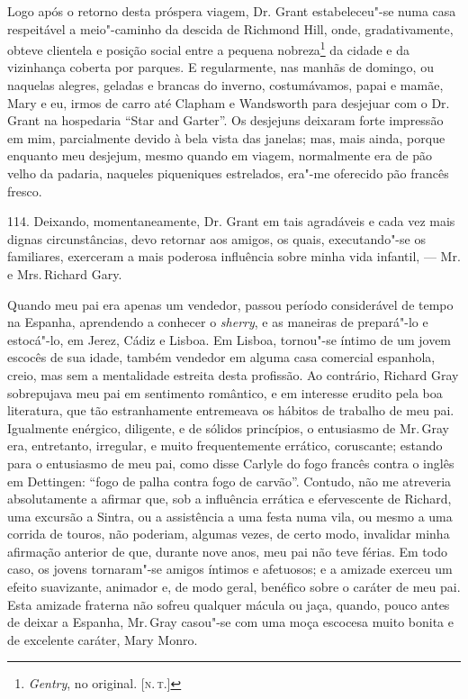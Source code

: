 Logo após o retorno desta próspera viagem, Dr. Grant estabeleceu"-se numa
casa respeitável a meio"-caminho da descida de Richmond Hill, onde,
gradativamente, obteve clientela e posição social entre a pequena
nobreza\footnote{\emph{Gentry}, no original. {[}\textsc{n.\,t.}{]}} da cidade e
da vizinhança coberta por parques. E regularmente, nas manhãs de
domingo, ou naquelas alegres, geladas e brancas do inverno,
costumávamos, papai e mamãe, Mary e eu, irmos de carro até Clapham e
Wandsworth para desjejuar com o Dr. Grant na hospedaria ``Star and
Garter''. Os desjejuns deixaram forte impressão em mim, parcialmente
devido à bela vista das janelas; mas, mais ainda, porque enquanto meu
desjejum, mesmo quando em viagem, normalmente era de pão velho da
padaria, naqueles piqueniques estrelados, era"-me oferecido pão francês
fresco.

114. Deixando, momentaneamente, Dr. Grant em tais agradáveis e cada vez
mais dignas circunstâncias, devo retornar aos amigos, os quais,
executando"-se os familiares, exerceram a mais poderosa influência sobre
minha vida infantil, --- Mr. e Mrs.\,Richard Gary.

Quando meu pai era apenas um vendedor, passou período considerável de
tempo na Espanha, aprendendo a conhecer o \emph{sherry}, e as maneiras
de prepará"-lo e estocá"-lo, em Jerez, Cádiz e Lisboa. Em Lisboa,
tornou"-se íntimo de um jovem escocês de sua idade, também vendedor em
alguma casa comercial espanhola, creio, mas sem a mentalidade estreita
desta profissão. Ao contrário, Richard Gray sobrepujava meu pai em
sentimento romântico, e em interesse erudito pela boa literatura, que
tão estranhamente entremeava os hábitos de trabalho de meu pai.
Igualmente enérgico, diligente, e de sólidos princípios, o entusiasmo de
Mr.\,Gray era, entretanto, irregular, e muito frequentemente errático,
coruscante; estando para o entusiasmo de meu pai, como disse Carlyle do
fogo francês contra o inglês em Dettingen: ``fogo de palha contra fogo
de carvão''. Contudo, não me atreveria absolutamente a afirmar que, sob
a influência errática e efervescente de Richard, uma excursão a Sintra,
ou a assistência a uma festa numa vila, ou mesmo a uma corrida de
touros, não poderiam, algumas vezes, de certo modo, invalidar minha
afirmação anterior de que, durante nove anos, meu pai não teve férias.
Em todo caso, os jovens tornaram"-se amigos íntimos e afetuosos; e a
amizade exerceu um efeito suavizante, animador e, de modo geral,
benéfico sobre o caráter de meu pai. Esta amizade fraterna não sofreu
qualquer mácula ou jaça, quando, pouco antes de deixar a Espanha, Mr.\,Gray casou"-se com uma moça escocesa muito bonita e de excelente caráter,
Mary Monro.

